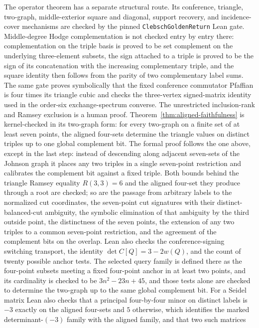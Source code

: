 The operator theorem has a separate structural route.  Its conference,
triangle, two-graph, middle-exterior square and diagonal, support recovery,
and incidence-cover mechanisms are checked by the pinned
\texttt{ClebschGoldenReturn} Lean gate.  Middle-degree Hodge complementation is not checked entry by entry
there: complementation on the triple basis is proved to be set complement on
the underlying three-element subsets, the sign attached to a triple is proved
to be the sign of its concatenation with the increasing complementary triple,
and the square identity then follows from the parity of two complementary
label sums.  The same gate proves symbolically that the fixed conference
commutator Pfaffian is four times its triangle cubic and checks the
three-vertex signed-matrix identity used in the order-six exchange-spectrum
converse.  The unrestricted inclusion-rank and Ramsey exclusion is a human
proof.  Theorem~\ref{thm:aligned-faithfulness} is kernel-checked in its
two-graph form: for every two-graph on a finite set of at least seven points,
the aligned four-sets determine the triangle values on distinct triples up to
one global complement bit.  The formal proof follows the one above, except in
the last step: instead of descending along adjacent seven-sets of the Johnson
graph it places any two triples in a single seven-point restriction and
calibrates the complement bit against a fixed triple.  Both
bounds behind the triangle Ramsey equality \(R(3,3)=6\) and the aligned
four-set they produce through a root are checked; so are the passage from
arbitrary labels to the normalized cut coordinates, the seven-point cut
signatures with their distinct-balanced-cut ambiguity, the symbolic
elimination of that ambiguity by the third outside point, the distinctness of
the seven points, the extension of any two triples to a common seven-point
restriction, and the agreement of the complement bits on the overlap.  Lean
also checks the conference-signing switching transport, the identity
\(\det C[Q]=3-2w(Q)\), and the count of twenty possible anchor tests.  The
selected query family is defined there as the four-point subsets meeting a
fixed four-point anchor in at least two points, and its cardinality is checked
to be \(3n^2-23n+45\), and those tests alone are checked to determine the
two-graph up to the same global complement bit.  For a Seidel matrix Lean also
checks that a principal four-by-four minor on distinct labels is \(-3\) exactly
on the aligned four-sets and \(5\) otherwise, which identifies the marked
determinant-\((-3)\) family with the aligned family, and that two such matrices
